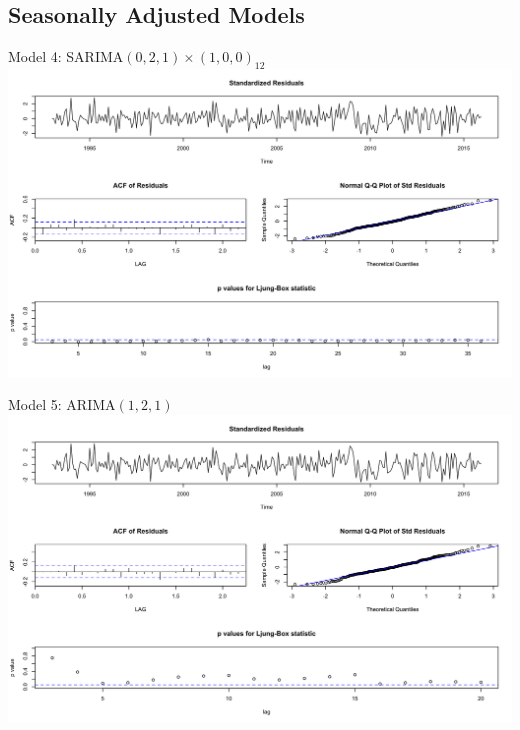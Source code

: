   \subsection{Seasonally Adjusted Models}
  \begin{frame}{Model 4: SARIMA\((0,2,1) \times (1,0,0)_{12}\)}
  	\includegraphics[width=\linewidth]{images/seasonallyadjustedmodel4}
  \end{frame}
  
  
  \begin{frame}{Model 5: ARIMA\((1,2,1)\)}
  		\includegraphics[width=\linewidth]{images/seasonallyadjustedmodel5}
  \end{frame}
  
  
